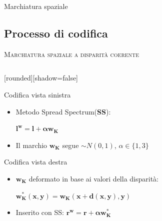 \documentclass{beamer}
\begin{document}
\begin{section}{Marchiatura spaziale}
\subsection{Processo di codifica}
\begin{frame}[t]{\textsc{Marchiatura spaziale a disparit\`{a} coerente}}
\vspace{-2em}
\begin{columns}
\begin{column}{6cm}
	[rounded][shadow=false]
\vspace{1em}
\begin{block}{Codifica vista sinistra}
\begin{itemize}
\item Metodo Spread Spectrum(\textbf{SS}):
\begin{center}
$\mathbf{l^{w} = l+\alpha w_{K}}$
\end{center}
\item Il marchio $\mathbf{w_{K}}$ segue $\sim N(0, 1)$, $\alpha \in \{1,3\}$
\end{itemize}
\end{block}
\begin{block}{Codifica vista destra}
\begin{itemize}
\item $\mathbf{w_{K}}$ deformato in base ai valori della disparit\`{a}:
\begin{center}
 $\mathbf{w^{*}_{K}(x,y) = w_{K}(x+d(x,y), y)}$
\end{center}
\item Inserito con SS:
$ \mathbf{r^{w} = r+\alpha w^{*}_{K}}$
\end{itemize}
\end{block}
\end{column}
\begin{column}{5cm}
\vspace{2em}
\begin{center}
\begin{figure}

\end{figure}
\end{center}
\end{column}
\end{columns}
\end{frame}
\end{section}
\end{document}
